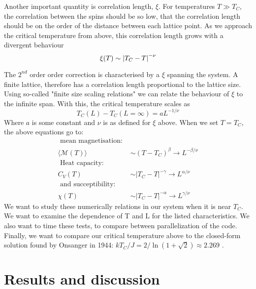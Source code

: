 \documentclass[10pt, twocolumn]{revtex4-1}
\begin{document}
Another important quantity is correlation length, $\xi$. For temperatures $T \gg T_C$, the correlation between the spins should be so low, that the
correlation length should be on the order of the distance between each lattice point. As we approach the critical temperature from above, this correlation
length grows with a divergent behaviour
\[ \xi(T) \sim \qty| T_C - T |^{-\nu} \]

The $2^{nd}$ order order correction is characterised by a $\xi$ spanning the system. A finite lattice, therefore has a correlation length proportional to
the lattice size. Using so-called "finite size scaling relations" we can relate the behaviour of $\xi$ to the infinite span. With this, the critical
temperature scales as
\[ T _ { C } ( L ) - T _ { C } ( L = \infty ) = a L ^ { - 1 / \nu } \]
Where $a$ is some constant and $\nu$ is as defined for $\xi$ above. When we set $T = T_C$, the above equations go to:
\begin{align*}
    \text{ mean magnetisation: } \\
    \langle \mathcal { M } ( T ) \rangle &\sim \left( T - T _ { C } \right) ^ { \beta } \rightarrow L ^ { - \beta / \nu }\\
    \text{ Heat capacity: } \\
    C _ { V } ( T ) &\sim \left| T _ { C } - T \right| ^ { - \gamma } \rightarrow L ^ { \alpha / \nu }\\
    \text{ and succeptibility: } \\
    \chi ( T ) &\sim \left| T _ { C } - T \right| ^ { - \alpha } \rightarrow L ^ { \gamma / \nu }
\end{align*}
We want to study these numerically relations in our system when it is near $T_C$. We want to examine the dependence of T and L for the listed characteristics.
We also want to time these tests, to compare between parallelization of the code. Finally, we want to compare our critical temperature above to the
closed-form solution found by Onsanger in 1944: $k T _ { C } / J = 2 / \ln ( 1 + \sqrt { 2 } ) \approx 2.269$ \cite{PhysRev.65.117}.


\section{Results and discussion}
\end{document}
